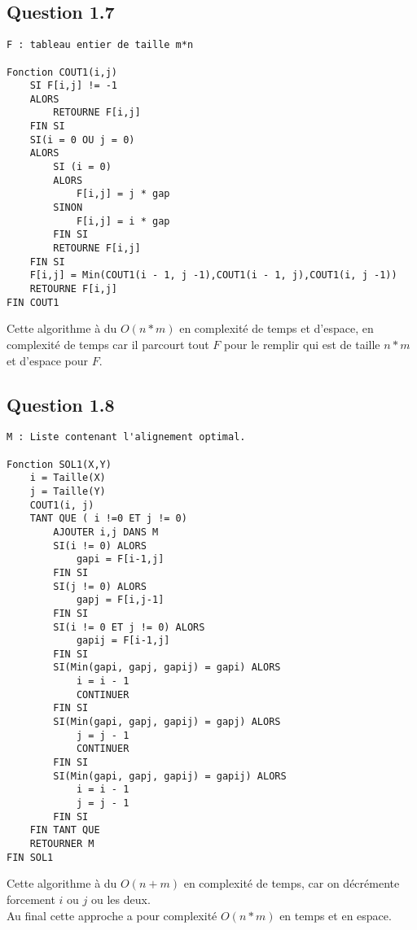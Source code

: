 \documentclass[5pt,a4paper]{report}
\begin{document}
	\subsection*{Question 1.7}
	\begin{lstlisting}
F : tableau entier de taille m*n

Fonction COUT1(i,j)
	SI F[i,j] != -1
	ALORS
		RETOURNE F[i,j]
	FIN SI
	SI(i = 0 OU j = 0)
	ALORS
		SI (i = 0)
		ALORS
			F[i,j] = j * gap
		SINON
			F[i,j] = i * gap
		FIN SI
		RETOURNE F[i,j]
	FIN SI
	F[i,j] = Min(COUT1(i - 1, j -1),COUT1(i - 1, j),COUT1(i, j -1))
	RETOURNE F[i,j]
FIN COUT1
	\end{lstlisting}
	Cette algorithme à du $O(n * m)$ en complexité de temps et d'espace, en complexité de 
	temps car il parcourt tout $F$ pour le remplir qui est de taille $n*m$ et d'espace pour $F$.
	
	\subsection*{Question 1.8}
	\begin{lstlisting}
M : Liste contenant l'alignement optimal.

Fonction SOL1(X,Y)
	i = Taille(X)
	j = Taille(Y)
	COUT1(i, j)
	TANT QUE ( i !=0 ET j != 0)
		AJOUTER i,j DANS M
		SI(i != 0) ALORS
			gapi = F[i-1,j]
		FIN SI
		SI(j != 0) ALORS
			gapj = F[i,j-1]
		FIN SI
		SI(i != 0 ET j != 0) ALORS
			gapij = F[i-1,j]
		FIN SI
		SI(Min(gapi, gapj, gapij) = gapi) ALORS
			i = i - 1
			CONTINUER
		FIN SI
		SI(Min(gapi, gapj, gapij) = gapj) ALORS
			j = j - 1
			CONTINUER
		FIN SI
		SI(Min(gapi, gapj, gapij) = gapij) ALORS
			i = i - 1
			j = j - 1
		FIN SI
	FIN TANT QUE
	RETOURNER M
FIN SOL1
	\end{lstlisting}
	Cette algorithme à du $O(n + m)$ en complexité de temps, car on décrémente forcement $i$ ou $j$ ou les deux.\\
	Au final cette approche a pour complexité $O(n * m)$ en temps et en espace.
	
\end{document}
